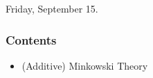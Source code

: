 Friday, September 15.

\subsubsection*{Contents}
\begin{itemize}
    \item (Additive) Minkowski Theory
\end{itemize}